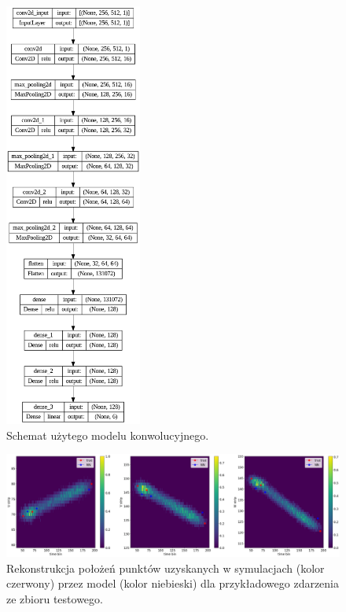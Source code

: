 \documentclass{article}
\begin{document}
\begin{figure}[H]
        \centering \includegraphics[width= 0.4\textwidth]{img/model_uvwt.png}
        \caption{
                \label{fig:schemat}
                Schemat użytego modelu konwolucyjnego.
        }
\end{figure}
\begin{figure}[H]
        \centering \includegraphics[width= \textwidth]{img/model_uvwt_example.png}
        \caption{
                \label{fig:schemat2}
                Rekonstrukcja położeń punktów uzyskanych w symulacjach (kolor czerwony) przez model (kolor niebieski) dla przykładowego zdarzenia ze zbioru testowego.
        }
\end{figure}
\end{document}
